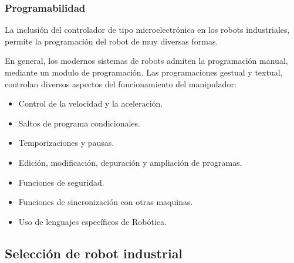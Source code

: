 \documentclass[12pt,a4paper]{report}
\begin{document}
\subsubsection{Programabilidad}

La inclusión del controlador de tipo microelectrónica en los robots
industriales, permite la programación del robot de muy diversas formas.

En general, los modernos sistemas de robots admiten la programación manual,
mediante un modulo de programación. Las programaciones gestual y textual,
controlan diversos aspectos del funcionamiento del manipulador:

\begin{itemize}
    \item Control de la velocidad y la aceleración.  
    \item Saltos de programa condicionales.  
    \item Temporizaciones y pausas.  
    \item Edición, modificación, depuración y ampliación de programas.  
    \item Funciones de seguridad.  
    \item Funciones de sincronización con otras maquinas.  
    \item Uso de lenguajes específicos de Robótica.
\end{itemize}


\subsection{Selección de robot industrial}
\end{document}
